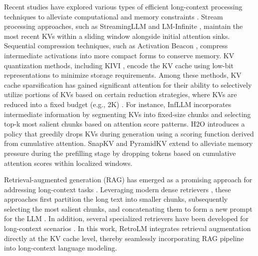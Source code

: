 Recent studies have explored various types of efficient long-context processing techniques to alleviate computational and memory constraints \citep{sun2024shadowkv, liao2024e2llm, yang2024pyramidinfer}.
Stream processing approaches, such as StreamingLLM \citep{streamingllm} and LM-Infinite \citep{lminfinite}, maintain the most recent KVs within a sliding window alongside initial attention sinks. Sequential compression techniques, such as Activation Beacon \citep{zhang2024soaring}, compress intermediate activations into more compact forms to conserve memory. KV quantization methods, including KIVI \citep{liu2024kivi}, encode the KV cache using low-bit representations to minimize storage requirements. 
Among these methods, KV cache sparsification has gained significant attention for their ability to selectively utilize portions of KVs based on certain reduction strategies, where KVs are reduced into a fixed budget (e.g., 2K) \citep{xu2024think, quest, huang2024locret, liu2024retrievalattention, shi2024discovering}. For instance, InfLLM \citep{infllm} incorporates intermediate information by segmenting KVs into fixed-size chunks and selecting top-k most salient chunks based on attention score patterns. H2O \cite{h2o} introduces a policy that greedily drops KVs during generation using a scoring function derived from cumulative attention. SnapKV and PyramidKV \citep{snapkv, pyramidkv} extend to alleviate memory pressure during the prefilling stage by dropping tokens based on cumulative attention scores within localized windows. 

Retrieval-augmented generation (RAG) has emerged as a promising approach for addressing long-context tasks \citep{xu2023retrieval, li2024long, yue2024inference}. Leveraging modern dense retrievers \citep{karpukhin2020dense, xiao2023c}, these approaches first partition the long text into smaller chunks, subsequently selecting the most salient chunks, and concatenating them to form a new prompt for the LLM \citep{zhao2024retrieval}. In addition, several specialized retrievers have been developed for long-context scenarios \citep{luo2024bge, gunther2023jina}. In this work, RetroLM integrates retrieval augmentation directly at the KV cache level, thereby seamlessly incorporating RAG pipeline into long-context language modeling.